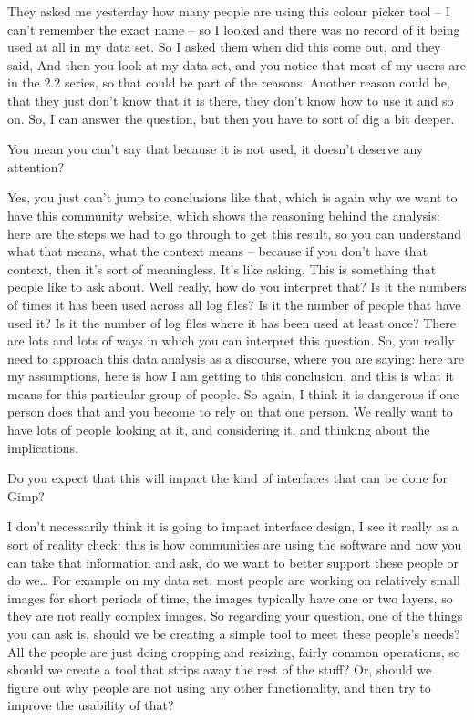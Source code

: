 {They asked me yesterday how many people are using this colour picker
tool {--} I can't remember the exact name {--} so I looked and there
was no record of it being used at all in my data set. So I asked them
when did this come out, and they said,  And then you look at my data set, and you notice that most
of my users are in the 2.2 series, so that could be part of the
reasons. Another reason could be, that they just don't know that it is
there, they don't know how to use it and so on. So, I can answer the
question, but then you have to sort of dig a bit deeper.\par

 You mean you can't say that because it is not used, it doesn't
deserve any attention?\par

 Yes, you just can't jump to conclusions like that, which is again
why we want to have this community website, which shows the reasoning
behind the analysis: here are the steps we had to go through to get
this result, so you can understand what that means, what the context
means {--} because if you don't have that context, then it's sort of
meaningless. It's like asking,  This is something that people like to ask about. Well
really, how do you interpret that? Is it the numbers of times it has
been used across all log files? Is it the number of people that have
used it? Is it the number of log files where it has been used at least
once? There are lots and lots of ways in which you can interpret this
question. So, you really need to approach this data analysis as a
discourse, where you are saying: here are my assumptions, here is how I
am getting to this conclusion, and this is what it means for this
particular group of people. So again, I think it is dangerous if one
person does that and you become to rely on that one person. We really
want to have lots of people looking at it, and considering it, and
thinking about the implications.\par

 Do you expect that this will impact the kind of interfaces that
can be done for Gimp?\par

 I don't necessarily think it is going to impact interface design,
I see it really as a sort of reality check: this is how communities are
using the software and now you can take that information and ask, do we
want to better support these people or do we{\dots} For example on my
data set, most people are working on relatively small images for short
periods of time, the images typically have one or two layers, so they
are not really complex images. So regarding your question, one of the
things you can ask is, should we be creating a simple tool to meet
these people's needs? All the people are just doing cropping and
resizing, fairly common operations, so should we create a tool that
strips away the rest of the stuff? Or, should we figure out why people
are not using any other functionality, and then try to improve the
usability of that?\par

}
